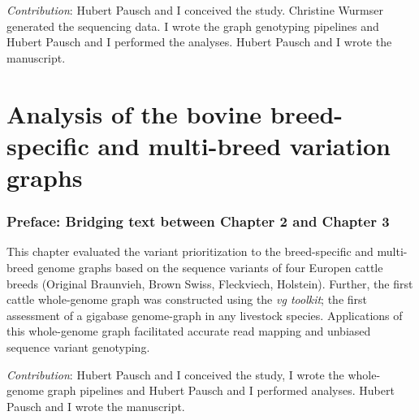 \documentclass[11 pt, a4paper, notitlepage, twoside]{report}
\begin{document}
\emph{Contribution}: Hubert Pausch and I conceived the study. Christine Wurmser generated the sequencing data. I wrote the graph genotyping pipelines and Hubert Pausch and I performed the analyses. Hubert Pausch and I wrote the manuscript. 




\iftwoside
\cleardoublepage
\newpage
\fi


\chapter[Bovine whole-genome variations graphs]{\LARGE{Analysis of the bovine breed-specific and multi-breed variation graphs}}
\label{chap:wholegraph}

\subsection*{Preface: Bridging text between Chapter 2 and Chapter 3}
\normalsize
This chapter evaluated the variant prioritization to the breed-specific and multi-breed genome graphs based on the sequence variants of four Europen cattle breeds (Original Braunvieh, Brown Swiss, Fleckviech, Holstein). Further, the first cattle whole-genome graph was constructed using the \emph{vg toolkit}; the first assessment of a gigabase genome-graph in any livestock species. Applications of this whole-genome graph facilitated accurate read mapping and unbiased sequence variant genotyping. \\


\bigskip

\emph{Contribution}: Hubert Pausch and I conceived the study, I wrote the whole-genome graph pipelines and Hubert Pausch and I performed analyses. Hubert Pausch and I wrote the manuscript. 

\end{document}
